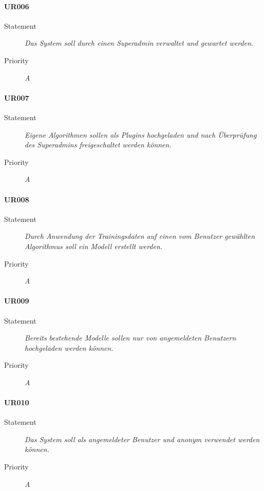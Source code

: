 \paragraph{UR006}
\begin{description}
\item[Statement] \textit{Das System soll durch einen \gls{Superadmin} verwaltet und gewartet werden.}
\item[Priority] \textit{A}
\end{description}

\paragraph{UR007}
\begin{description}
\item[Statement] \textit{Eigene Algorithmen sollen als Plugins hochgeladen und nach Überprüfung des \gls{Superadmin}s freigeschaltet werden können.}
\item[Priority] \textit{A}
\end{description}

\paragraph{UR008}
\begin{description}
\item[Statement] \textit{Durch Anwendung der Trainingsdaten auf einen vom Benutzer gewählten Algorithmus soll ein Modell erstellt werden.}
\item[Priority] \textit{A}
\end{description}

\paragraph{UR009}
\begin{description}
\item[Statement] \textit{Bereits bestehende Modelle sollen nur von angemeldeten Benutzern hochgeladen werden können.}
\item[Priority] \textit{A}
\end{description}

\paragraph{UR010}
\begin{description}
\item[Statement] \textit{Das System soll als angemeldeter Benutzer und anonym verwendet werden können.}
\item[Priority] \textit{A}
\end{description}

